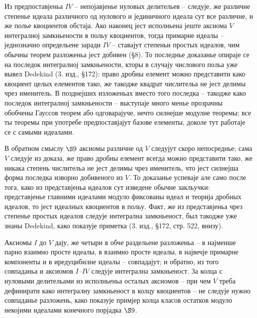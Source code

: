 ﻿\documentclass[11pt]{article}
\begin{document}
Из предпоставјеньа $IV$ -- непојавјенье нуловых делительев -- следује, же различне степенье идеала различного од нулового и јединичного идеала сут все различне, и же полье квоциентов обстаја. Ако наконец јест исполньена јеште аксиома $V$ интегралној замкньености в польу квоциентов, тогда примарне идеалы -- једнозначно определьене заради $IV$ -- ставајут степеньи простых идеалов, чим обычны теорем разложеньа јест добивен (§8). То последнье доказанье опираје се на последок интегралној замкньености, кторы в случају числового польа уже вывел Dedekind (3. изд., §172): право дробны елемент можно представити како квоциент целых елементов тако, же такодже квадрат числительа не јест делимы чрез именитель. В позднејших изложеньах вместо того последка -- такодже како последок интегралној замкньености -- выступаје много менье прозрачны обобчены Гауссов теорем або одговарајуче, нечто силнејше модулне теоремы; все ты теоремы при употребе предпоставјајут базове елементы, доколе тут работаје се с самыми идеалами.

В обратном смыслу \hbox{\(\S 9\)} аксиомы различне од $V$ следујут скоро непосреднье; сама $V$ следује из доказа, же право дробны елемент всегда можно представити тако, же никака степень числительа не јест делимы чрез именитель, что јест силнејша форма последка изворно добивеного из $V$. То доказанье успеваје але само после тога, како из представјеньа идеалов сут изведене обычне закльучки: представјенье главними идеалами модуло фиксованы идеал и теорија дробных идеалов, то јест идеалных квоциентов в польу. Факт, же из представјеньа чрез степенье простых идеалов следује интегрална замкньеност, был такодже уже знаны Dedekind, како показује приметка (3. изд., §172, стр. 522, внизу).

Аксиомы $I$ до $V$ дају, же четыри в обче раздельене разложеньа -- в најменше парно взаимно просте идеалы, в взаимно просте идеалы, в највечје примарне компоненты и в иредуцибилне идеалы -- совпадајут; и обратно, из того совпаданьа и аксиомов $I$--$IV$ следује интегрална замкньеност. За колца с нуловыми делительами из исполньеньа осталых аксиомов -- при чем $V$ треба дефинирати како интегралну замкньеност в колцу квоциентов -- не следује нужно совпаданье разложень, како показује примјер колца класов остатков модуло некојими идеалами конечного порјадка \hbox{\(\S 9\)}.
\end{document}
